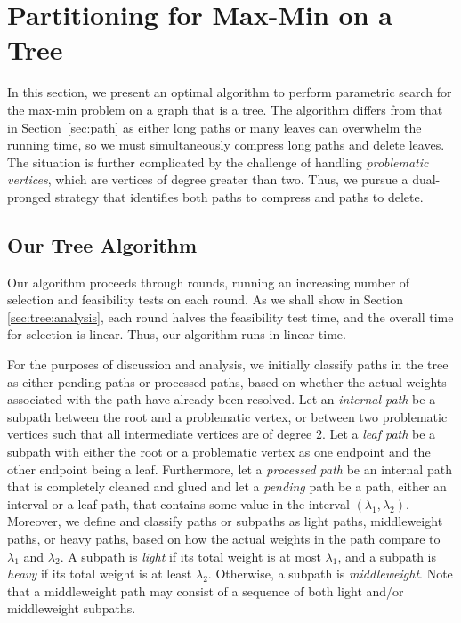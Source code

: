 \section{Partitioning for Max-Min on a Tree}
\label{sec:tree}
In this section, we present an optimal algorithm to perform parametric search for the max-min problem on a graph that is a tree. 
The algorithm differs from that in Section~\ref{sec:path} as either long paths or many leaves can overwhelm the running time, so we must simultaneously compress long paths and delete leaves.  
The situation is further complicated by the challenge of handling \emph{problematic vertices}, which are vertices of degree greater than two. 
Thus, we pursue a dual-pronged strategy that identifies both paths to compress and paths to delete. 

\subsection{Our Tree Algorithm}
Our algorithm proceeds through rounds, running an increasing number of selection and feasibility tests on each round. 
As we shall show in Section \ref{sec:tree:analysis}, each round halves the feasibility test time, and the overall time for selection is linear. 
Thus, our algorithm runs in linear time.

For the purposes of discussion and analysis, we initially classify paths in the tree as either pending paths or processed paths, based on whether the actual weights associated with the path have already been resolved. 
Let an \emph{internal path} be a subpath between the root and a problematic vertex, or between two problematic vertices such that all intermediate vertices are of degree $2$. 
Let a \emph{leaf path} be a subpath with either the root or a problematic vertex as one endpoint and the other endpoint being a leaf. 
Furthermore, let a \emph{processed path} be an internal path that is completely cleaned and glued and let a \emph{pending} path be a path, either an interval or a leaf path, that contains some value in the interval $(\lambda_1,\lambda_2)$. 
Moreover, we define and classify paths or subpaths as light paths, middleweight paths, or heavy paths, based on how the actual weights in the path compare to $\lambda_1$ and $\lambda_2$. 
A subpath is \emph{light} if its total weight is at most $\lambda_1$, and a subpath is \emph{heavy} if its total weight is at least $\lambda_2$. 
Otherwise, a subpath is \emph{middleweight}. 
Note that a middleweight path may consist of a sequence of both light and/or middleweight subpaths.

